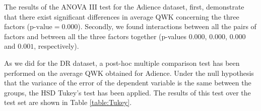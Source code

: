 \documentclass[preprint]{elsarticle}
\begin{document}

The results of the ANOVA III test for the Adience dataset, first, demonstrate that there exist significant differences in average QWK concerning the three factors ($\text{p-value} = 0.000$). Secondly, we found interactions between all the pairs of factors and between all the three factors together (p-values $0.000$, $0.000$, $0.000$ and $0.001$, respectively).

As we did for the DR dataset, a post-hoc multiple comparison test has been performed on the average QWK obtained for Adience. Under the null hypothesis that the variance of the error of the dependent variable is the same between the groups, the HSD Tukey's test has been applied. The results of this test over the test set are shown in Table \ref{table:Tukey}.
\end{document}

